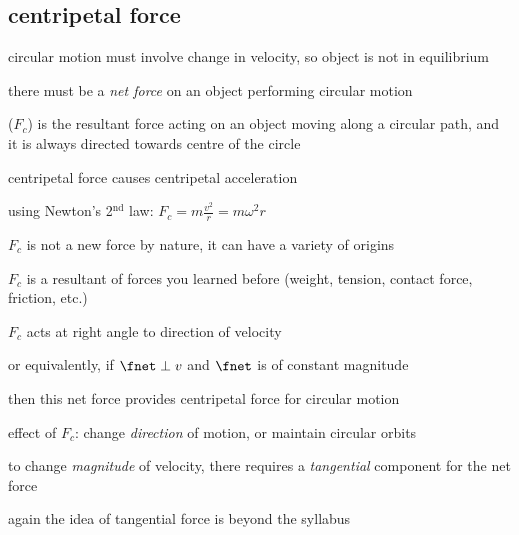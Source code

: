\subsection{centripetal force}

circular motion must involve change in velocity, so object is not in equilibrium 

there must be a \emph{net force} on an object performing circular motion 

\begin{ilight}
	 ($F_c$) is the resultant force acting on an object
	moving along a circular path, and it is always directed towards centre of the circle
\end{ilight}

\cmt centripetal force causes centripetal acceleration

using Newton's 2$^\text{nd}$ law: $\boxed{ F_c = m\frac{v^2}{r} = m\omega^2r}$

\cmt $F_c$ is not a new force by nature, it can have a variety of origins

$F_c$ is a resultant of forces you learned before (weight, tension, contact force, friction, etc.)

\cmt $F_c$ acts at right angle to direction of velocity

or equivalently, if $\fnet \perp v$ and $\fnet$ is of constant magnitude

then this net force provides centripetal force for circular motion

\cmt effect of $F_c$: change \emph{direction} of motion, or maintain circular orbits

to change \emph{magnitude} of velocity, there requires a \emph{tangential} component for the net force

again the idea of tangential force is beyond the syllabus




